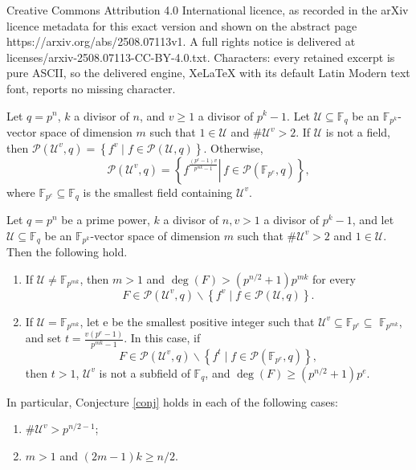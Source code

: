 \documentclass[10pt,a4paper]{amsart}
\newcommand{\F}{\mathbb{F}}
\begin{document}
Creative Commons Attribution 4.0 International licence, as recorded in the arXiv licence metadata for this exact version and shown on the abstract page https://arxiv.org/abs/2508.07113v1. A full rights notice is delivered at licenses/arxiv-2508.07113-CC-BY-4.0.txt. Characters: every retained excerpt is pure ASCII, so the delivered engine, XeLaTeX with its default Latin Modern text font, reports no missing character.
\begin{conjecture}\label{conj}
Let $q=p^n$, $k$ a divisor of $n$, and $v\geq 1$ a divisor of $p^k-1$.
Let $\mathcal{U} \subseteq \mathbb{F}_q$ be an $\mathbb{F}_{p^k}$-vector space of dimension $m$ such that $1 \in \mathcal{U}$ and
$\# \mathcal{U}^v>2$. If $\mathcal{U}$ is not a field, then $\mathcal{P}\left(\mathcal{U}^v, q\right)=\left\{f^v \mid f \in \mathcal{P}(\mathcal{U}, q)\right\}$. Otherwise,
$$
\mathcal{P}\left(\mathcal{U}^v, q\right)=\left\{\left.f^{\frac{\left(p^e-1\right) v}{p^{m k}-1}} \right\rvert\, f \in \mathcal{P}\left(\mathbb{F}_{p^e}, q\right)\right\},
$$
where $\mathbb{F}_{p^e}  \subseteq \F_q$ is the smallest field containing $\mathcal{U}^v$.
\end{conjecture}

\begin{theorem}\label{pre-conj}  Let $q=p^n$ be a prime power, $k$ a divisor of $n, v>1$  a divisor of $p^k-1$, and let $\mathcal{U} \subseteq \mathbb{F}_q$ be an $\mathbb{F}_{p^k}$-vector space of dimension $m$ such that $\# \mathcal{U}^v>2$ and $1 \in \mathcal{U}$. Then the following hold.
\begin{enumerate}[\rm(i)]
\item If $\mathcal{U} \neq \mathbb{F}_{p^{m k}}$, then $m>1$ and $\operatorname{deg}(F)>\left(p^{n / 2}+1\right) p^{m k}$ for every
$$
F \in \mathcal{P}\left(\mathcal{U}^v, q\right) \backslash\left\{f^v \mid f \in \mathcal{P}(\mathcal{U}, q)\right\} .
$$
\item  If $\mathcal{U}=\mathbb{F}_{p^{m k}}$, let e be the smallest positive integer such that $\mathcal{U}^v \subseteq \mathbb{F}_{p^e} \subseteq$ $\mathbb{F}_{p^{m k}}$, and set $t=\frac{v\left(p^e-1\right)}{p^{m k}-1} $. In this case, if
$$
F \in \mathcal{P}\left(\mathcal{U}^v, q\right) \backslash\left\{f^t \mid f \in \mathcal{P}\left(\mathbb{F}_{p^e}, q\right)\right\},
$$
then $t>1$, $\mathcal{U}^v$ is not a subfield of $\mathbb{F}_q$, and $\operatorname{deg}(F) \geq\left(p^{n / 2}+1\right) p^e$.
 \end{enumerate}
In particular, Conjecture  \ref{conj} holds in each of the following cases:
\begin{enumerate}[\rm(a)]
\item $\# \mathcal{U}^v>p^{n / 2-1}$;
\item  $m>1$ and $(2 m-1) k \geq n / 2$.

 \end{enumerate}

\end{theorem}
\end{document}
